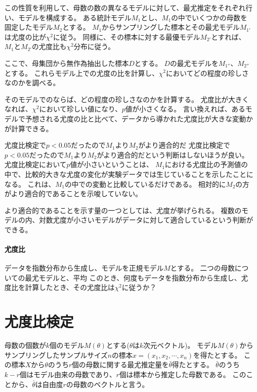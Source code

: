 この性質を利用して、母数の数の異なるモデルに対して、最尤推定をそれぞれ行い、モデルを構成する。
ある統計モデル$M_1$とし、$M_1$の中でいくつかの母数を固定したモデル$M_2$とする。
$M_1$からサンプリングした標本とその最尤モデル$M_{1'}$は尤度の比が$\chi^2$に従う。
同様に、その標本に対する最優モデル$M_{2'}$とすれば、$M_1$と$M_{2'}$の尤度比も$\chi^2$分布に従う。

ここで、母集団から無作為抽出した標本$D$とする。
$D$の最尤モデルを$M_{1''}$、$M_{2''}$とする。
これらモデル上での尤度の比を計算し、$\chi^2$においてどの程度の珍しさなのかを調べる。


そのモデルでのならば、どの程度の珍しさなのかを計算する。
尤度比が大きくなれば、$\chi^2$において珍しい値になり、$p$値が小さくなる。
言い換えれば、あるモデルで予想される尤度の比と比べて、データから導かれた尤度比が大きな変動かが計算できる。
\fi

\begin{SMbox}{尤度比検定で$p<0.05$だったので$M_1$より$M_2$がより適合的だ}
 尤度比検定で$p<0.05$だったので$M_1$より$M_2$がより適合的だという判断はしないほうが良い。
 尤度比検定において$p$値が小さいということは、
 $M_1$における尤度比の予測値の中で、比較的大きな尤度の変化が実験データでは生じていることを示したことになる。
 これは、$M_1$の中での変動と比較しているだけである。
 相対的に$M_2$の方がより適合的であることを示唆していない。

 より適合的であることを示す量の一つとしては、尤度が挙げられる。
 複数のモデルの内、対数尤度が小さいモデルがデータに対して適合しているという判断ができる。
\end{SMbox}



\paragraph{尤度比}
データを指数分布から生成し、モデルを正規モデル$M$とする。
二つの母数についての最尤モデルと、平均
このとき、何度もデータを指数分布から生成し、尤度比を計算したとき、その尤度比は$\chi^2$に従うか？
\fi

\section{尤度比検定}
母数の個数が$k$個のモデル$M(\theta)$とする($\theta$は$k$次元ベクトル)。
モデル$M(\theta)$からサンプリングしたサンプルサイズ$n$の標本$x=(x_1,x_2,\cdots,x_n)$を得たとする。
この標本$X$から$\theta$のうち$r$個の母数に関する最尤推定量を$\bar{\theta}$得たとする。
$\bar{\theta}$のうち$k-r$個はモデル由来の母数であり、$r$個は標本から推定した母数である。
このことから、$\bar{\theta}$は自由度$r$の母数のベクトルと言う。

